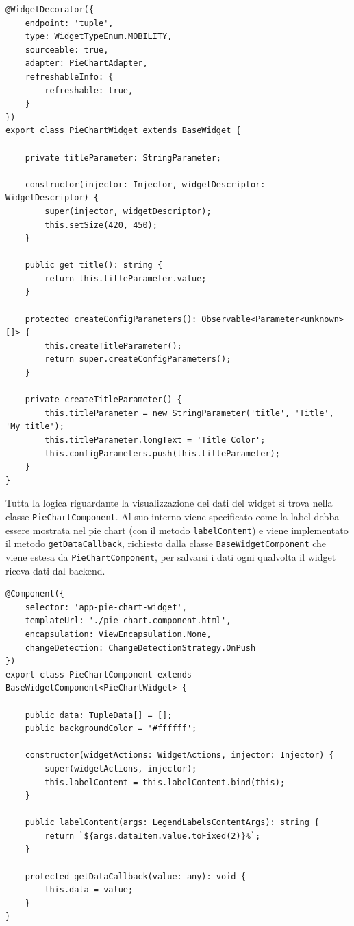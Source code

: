 \begin{lstlisting}[caption={Classe PieChartWidget}, style=javaScriptCode]
@WidgetDecorator({
    endpoint: 'tuple',
    type: WidgetTypeEnum.MOBILITY,
    sourceable: true,
    adapter: PieChartAdapter,
    refreshableInfo: {
        refreshable: true,
    }
})
export class PieChartWidget extends BaseWidget {

    private titleParameter: StringParameter;

    constructor(injector: Injector, widgetDescriptor: WidgetDescriptor) {
        super(injector, widgetDescriptor);
        this.setSize(420, 450);
    }

    public get title(): string {
        return this.titleParameter.value;
    }

    protected createConfigParameters(): Observable<Parameter<unknown>[]> {
        this.createTitleParameter();
        return super.createConfigParameters();
    }

    private createTitleParameter() {
        this.titleParameter = new StringParameter('title', 'Title', 'My title');
        this.titleParameter.longText = 'Title Color';
        this.configParameters.push(this.titleParameter);
    }
}

\end{lstlisting}
Tutta la logica riguardante la visualizzazione dei dati del widget si trova nella classe \verb|PieChartComponent|. Al suo interno viene specificato come la label debba essere mostrata nel pie chart (con il metodo \verb|labelContent|) e viene implementato il metodo \verb|getDataCallback|, richiesto dalla classe \verb|BaseWidgetComponent| che viene estesa da \verb|PieChartComponent|, per salvarsi i dati ogni qualvolta il widget riceva dati dal backend.\\
\begin{lstlisting}[caption={Classe PieChartComponent}, style=javaScriptCode]
@Component({
    selector: 'app-pie-chart-widget',
    templateUrl: './pie-chart.component.html',
    encapsulation: ViewEncapsulation.None,
    changeDetection: ChangeDetectionStrategy.OnPush
})
export class PieChartComponent extends BaseWidgetComponent<PieChartWidget> {

    public data: TupleData[] = [];
    public backgroundColor = '#ffffff';

    constructor(widgetActions: WidgetActions, injector: Injector) {
        super(widgetActions, injector);
        this.labelContent = this.labelContent.bind(this);
    }

    public labelContent(args: LegendLabelsContentArgs): string {
        return `${args.dataItem.value.toFixed(2)}%`;
    }

    protected getDataCallback(value: any): void {
        this.data = value;
    }
}
\end{lstlisting}
